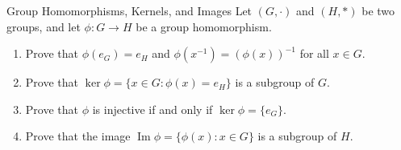 \begin{exercise}{Group Homomorphisms, Kernels, and Images}
Let $(G, \cdot)$ and $(H, *)$ be two groups, and let $\phi: G \to H$ be a group homomorphism.
\begin{enumerate}[leftmargin=1.5em,itemsep=2pt]
  \item Prove that $\phi(e_G) = e_H$ and $\phi(x^{-1}) = (\phi(x))^{-1}$ for all $x \in G$.
  \item Prove that $\ker \phi = \{x \in G : \phi(x) = e_H\}$ is a subgroup of $G$.
  \item Prove that $\phi$ is injective if and only if $\ker \phi = \{e_G\}$.
  \item Prove that the image $\operatorname{Im} \phi = \{\phi(x) : x \in G\}$ is a subgroup of $H$.
\end{enumerate}
\end{exercise}

\begin{tabletworkspace}[5.0cm]
\end{tabletworkspace}

